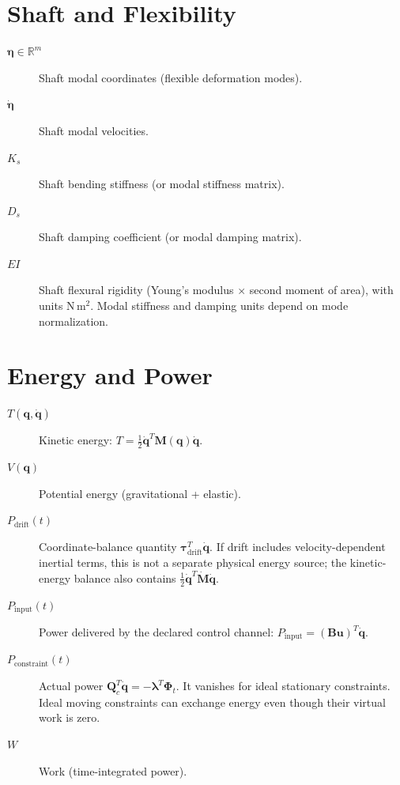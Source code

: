 \section*{Shaft and Flexibility}
\begin{description}
    \item[$\bm{\eta} \in \mathbb{R}^m$] Shaft modal coordinates (flexible deformation modes).
    \item[$\dot{\bm{\eta}}$] Shaft modal velocities.
    \item[$K_s$] Shaft bending stiffness (or modal stiffness matrix).
    \item[$D_s$] Shaft damping coefficient (or modal damping matrix).
    \item[$EI$] Shaft flexural rigidity (Young's modulus $\times$ second moment of area), with units N\,m$^2$. Modal stiffness and damping units depend on mode normalization.
\end{description}

\section*{Energy and Power}
\begin{description}
    \item[$T(\bm{q}, \dot{\bm{q}})$] Kinetic energy: $T = \frac{1}{2}\dot{\bm{q}}^T \bm{M}(\bm{q})\dot{\bm{q}}$.
    \item[$V(\bm{q})$] Potential energy (gravitational + elastic).
    \item[$P_{\mathrm{drift}}(t)$] Coordinate-balance quantity $\boldsymbol{\tau}_{\mathrm{drift}}^T\dot{\bm{q}}$. If drift includes velocity-dependent inertial terms, this is not a separate physical energy source; the kinetic-energy balance also contains $\tfrac12\dot{\bm{q}}^T\dot{\bm{M}}\dot{\bm{q}}$.
    \item[$P_{\mathrm{input}}(t)$] Power delivered by the declared control channel: $P_{\mathrm{input}} = (\bm{B}\bm{u})^T \dot{\bm{q}}$.
    \item[$P_{\mathrm{constraint}}(t)$] Actual power $\bm{Q}_c^T\dot{\bm{q}}=-\boldsymbol{\lambda}^T\bm{\Phi}_t$. It vanishes for ideal stationary constraints. Ideal moving constraints can exchange energy even though their virtual work is zero.
    \item[$W$] Work (time-integrated power).
\end{description}

